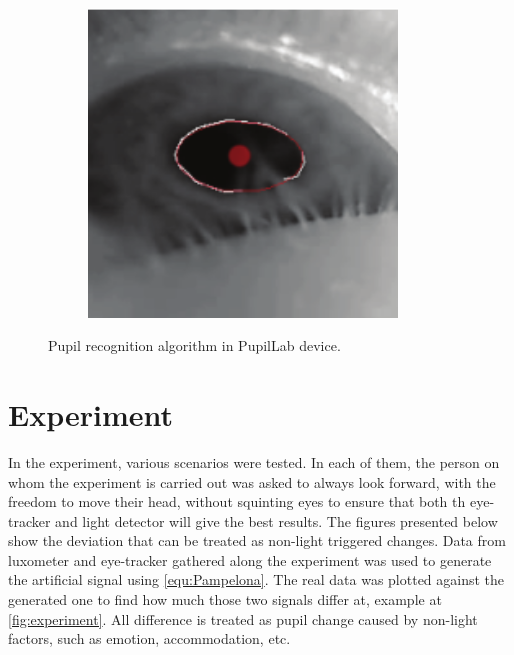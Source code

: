 \documentclass[USenglish,twocolumn]{article}
\begin{document}
\begin{figure}[H]
\begin{subfigure}[b]{0.15\textwidth}
	\label{fig:pupilLab5}
\end{subfigure}%
\begin{subfigure}[b]{0.15\textwidth}
	\centering
	\includegraphics[width=0.9\textwidth]{img/PupilLab/6.png}
	\caption{}
	\label{fig:pupilLab6}
\end{subfigure}
	\caption{Pupil recognition algorithm in PupilLab device.}	
	\label{fig:pupilLab}
\end{figure}

\section{Experiment}
In the experiment, various scenarios were tested. In each of them, the person on whom the experiment is carried out was asked to always look forward, with the freedom to move their head, without squinting eyes to ensure that both th eye-tracker and light detector will give the best results. The figures presented below show the deviation that can be treated as non-light triggered changes. Data from luxometer and eye-tracker gathered along the experiment was used to generate the artificial signal using \ref{equ:Pampelona}\cite{Pamplona}. The real data was plotted against the generated one to find how much those two signals differ at, example at \ref{fig:experiment}. All difference is treated as pupil change caused by non-light factors, such as emotion, accommodation, etc. 
\end{document}

